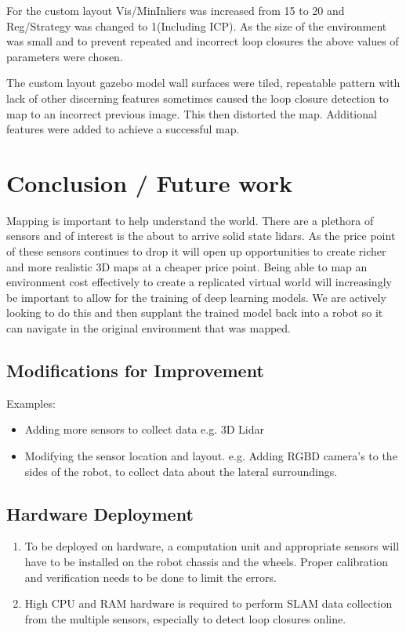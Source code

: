 \documentclass[10pt,journal,compsoc]{IEEEtran}
\begin{document}
For the custom layout Vis/MinInliers was increased from 15 to 20 and Reg/Strategy was changed to 1(Including ICP). As the size of the environment was small and to prevent repeated and incorrect loop closures the above values of parameters were chosen.

The custom layout gazebo model wall surfaces were tiled, repeatable pattern with lack of other discerning features sometimes caused the loop closure detection to map to an incorrect previous image. This then distorted the map. Additional features were added to achieve a successful map.



\section{Conclusion / Future work}

Mapping is important to help understand the world. There are a plethora of sensors and of interest is the about to arrive solid state lidars. As the price point of these sensors continues to drop it will open up opportunities to create richer and more realistic 3D maps at a cheaper price point.
Being able to map an environment cost effectively to create a replicated virtual world will increasingly be important to allow for the training of deep learning models. We are actively looking to do this and then supplant the trained model back into a robot so it can navigate in the original environment that was mapped.

\subsection{Modifications for Improvement}
Examples:
\begin{itemize}
\item Adding more sensors to collect data e.g. 3D Lidar
\item Modifying the sensor location and layout. e.g. Adding RGBD camera's to the sides of the robot, to collect data about the lateral surroundings.
\end{itemize}

\subsection{Hardware Deployment}
\begin{enumerate}
\item To be deployed on hardware, a computation unit and appropriate sensors will have to be installed on the robot chassis and the wheels. Proper calibration and verification needs to be done to limit the errors.
\item High CPU and RAM hardware is required to perform SLAM data collection from the multiple sensors, especially to detect loop closures online.
\end{enumerate}





\end{document}
